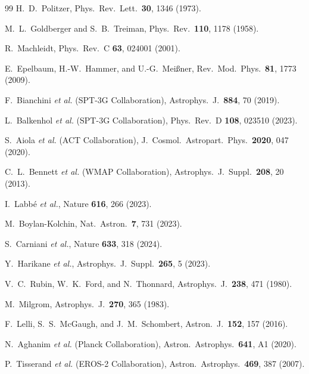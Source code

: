 \documentclass[aps,prd,twocolumn,superscriptaddress,nofootinbib,longbibliography]{revtex4-2}
\begin{document}
\begin{thebibliography}{99}
H.~D.~Politzer,
Phys.\ Rev.\ Lett.\ \textbf{30}, 1346 (1973).

M.~L.~Goldberger and S.~B.~Treiman,
Phys.\ Rev.\ \textbf{110}, 1178 (1958).


R.~Machleidt,
Phys.\ Rev.\ C \textbf{63}, 024001 (2001).

E.~Epelbaum, H.-W.~Hammer, and U.-G.~Mei{\ss}ner,
Rev.\ Mod.\ Phys.\ \textbf{81}, 1773 (2009).

F.~Bianchini \textit{et al.} (SPT-3G Collaboration),
Astrophys.\ J.\ \textbf{884}, 70 (2019).

L.~Balkenhol \textit{et al.} (SPT-3G Collaboration),
Phys.\ Rev.\ D \textbf{108}, 023510 (2023).

S.~Aiola \textit{et al.} (ACT Collaboration),
J.\ Cosmol.\ Astropart.\ Phys.\ \textbf{2020}, 047 (2020).

C.~L.~Bennett \textit{et al.} (WMAP Collaboration),
Astrophys.\ J.\ Suppl.\ \textbf{208}, 20 (2013).

I.~Labb\'{e} \textit{et al.},
Nature \textbf{616}, 266 (2023).

M.~Boylan-Kolchin,
Nat.\ Astron.\ \textbf{7}, 731 (2023).

S.~Carniani \textit{et al.},
Nature \textbf{633}, 318 (2024).

Y.~Harikane \textit{et al.},
Astrophys.\ J.\ Suppl.\ \textbf{265}, 5 (2023).


V.~C.~Rubin, W.~K.~Ford, and N.~Thonnard,
Astrophys.\ J.\ \textbf{238}, 471 (1980).

M.~Milgrom,
Astrophys.\ J.\ \textbf{270}, 365 (1983).


F.~Lelli, S.~S.~McGaugh, and J.~M.~Schombert,
Astron.\ J.\ \textbf{152}, 157 (2016).

N.~Aghanim \textit{et al.} (Planck Collaboration),
Astron.\ Astrophys.\ \textbf{641}, A1 (2020).


P.~Tisserand \textit{et al.} (EROS-2 Collaboration),
Astron.\ Astrophys.\ \textbf{469}, 387 (2007).


\end{thebibliography}
\end{document}
